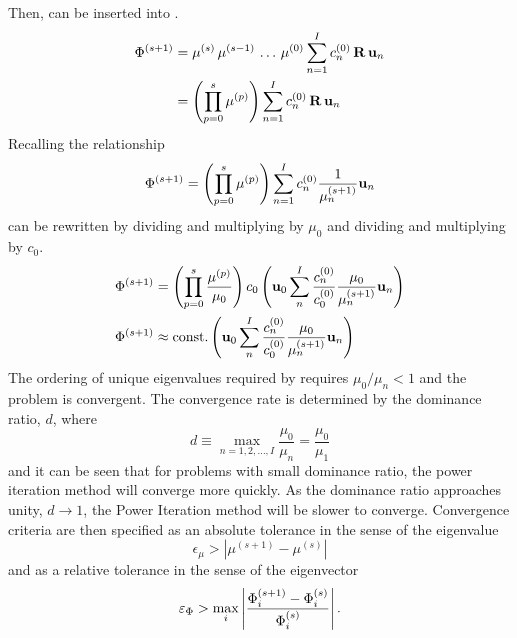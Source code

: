     Then,  can be inserted into
    .
    \begin{align}
      \Phi^{(s+1)} &= \mu^{(s)} \, \mu^{(s-1)} \, \ldots \, 
        \mu^{(0)} \sum_{n=1}^I c_n^{(0)} \, \mathbf{R} \, \mathbf{u}_n \\
      &= \left( \prod_{p=0}^{s} \mu^{(p)} \right) \sum_{n=1}^I c_n^{(0)} \, 
        \mathbf{R} \, \mathbf{u}_n
    \end{align}
    Recalling the relationship 
    \begin{equation}
      \label{eq:phi_expand_above}
      \Phi^{(s+1)} = \left( \prod_{p=0}^s \mu^{(p)} \right) 
        \sum_{n=1}^I c_n^{(0)} \frac{1}{\mu_n^{(s+1)}} \mathbf{u}_n
    \end{equation}
     can be rewritten by dividing and multiplying by
    $\mu_0$ and dividing and multiplying by $c_0$.
    \begin{align}
      \Phi^{(s+1)} &= \left( \prod_{p=0}^s \frac{\mu^{(p)}}{\mu_0} 
        \right) c_0 \left( \mathbf{u}_0 \sum_n^I \frac{c_n^{(0)}}{c_0^{(0)}}
        \frac{\mu_0}{\mu_n^{(s+1)}} \mathbf{u}_n \right) \\
      \label{eq:eigen_phi_converge}
      \Phi^{(s+1)} &\approx \text{const.} \left( 
        \mathbf{u}_0 \sum_n^I \frac{c_n^{(0)}}{c_0^{(0)}}
        \frac{\mu_0}{\mu_n^{(s+1)}} \mathbf{u}_n \right)
    \end{align}
    The ordering of unique eigenvalues required by  
    requires $\mu_0 / \mu_n < 1$ and the problem is convergent.  The 
    convergence rate is determined by the dominance ratio, $d$, where
    \begin{equation}
      \label{eq:dominance_ratio}
      d \equiv \max_{n=1,2,\ldots,I} \frac{\mu_0}{\mu_n} =
        \frac{\mu_0}{\mu_1}
    \end{equation}
    and it can be seen that for problems with small dominance ratio, the power
    iteration method will converge more quickly. As the dominance ratio
    approaches unity, $d \rightarrow 1$, the Power Iteration method will be
    slower to converge. Convergence criteria are then specified as an absolute 
    tolerance in the sense of the eigenvalue
    \begin{equation}
      \label{eq:eigenvalue_tol}
      \epsilon_{\mu} > | \mu^{(s+1)} - \mu^{(s)} |
    \end{equation}
    and as a relative tolerance in the sense of the eigenvector
    \begin{equation}
      \label{eq:eigenvector_tol}
      \varepsilon_{\Phi} > \max_i \left| \frac{\Phi_i^{(s+1)} - \Phi_i^{(s)}}
        {\Phi_i^{(s)}}\right| .
    \end{equation}

